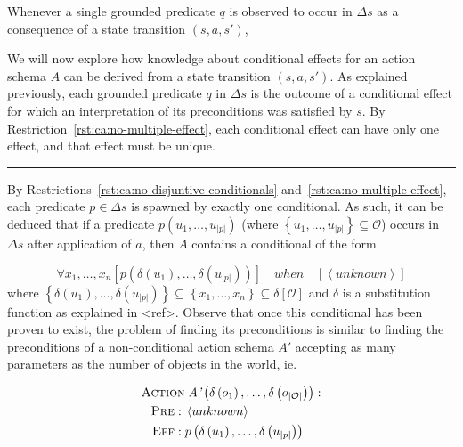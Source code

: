 \documentclass[../Master.tex]{subfiles}
\begin{document}
Whenever a single grounded predicate $q$ is observed to occur in $\Delta s$ as a consequence of a state transition $\left(s, a, s'\right)$, 

We will now explore how knowledge about conditional effects for an action schema $A$ can be derived from a  state transition $\left( s, a ,s' \right)$. As explained previously, each grounded predicate $q$ in $\Delta s$ is the outcome of a conditional effect for which an interpretation of its preconditions was satisfied by $s$. By Restriction~\ref{rst:ca:no-multiple-effect}, each conditional effect can have only one effect, and that effect must be unique. 

\noindent\rule{\textwidth}{1pt}

By Restrictions~\ref{rst:ca:no-disjuntive-conditionals} and~\ref{rst:ca:no-multiple-effect}, each predicate $p \in \Delta s$ is spawned by exactly one conditional. As such, it can be deduced that if a predicate $p\left(u_1, \dots, u_{|p|}\right)$ (where $\left\{u_1, \dots, u_{|p|}\right\} \subseteq \mathcal{O}$) occurs in $\Delta s$ after application of $a$, then $A$ contains a conditional of the form

\begin{equation*}
    \forall x_1, \dots, x_n 
        \left[ p\left(\delta\left(u_1\right), \dots, \delta \left(u_{|p|}\right) \right) \right] \quad when \quad 
        \left[ \left<unknown\right> \right]
\end{equation*}
where $\left\{\delta \left( u_1 \right), \dots, \delta \left(u_{|p|} \right) \right\} \subseteq \left\{ x_1, \dots, x_n \right\} \subseteq \delta [\mathcal{O}]$ and $\delta$ is a substitution function as explained in <ref>. Observe that once this conditional has been proven to exist, the problem of finding its preconditions is similar to finding the preconditions of a non-conditional action schema $A'$ accepting as many parameters as the number of objects in the world, ie. 

\begin{align*}
    \begin{split}
        \textsc{Action} &\; \textit{A'}\left(\delta \left( o_1 \right), \ldots, \delta \left( o_{|\mathcal{O}|}\right)\right): \\
        \textsc{Pre}: \; & \left< unknown \right> \\
        \textsc{Eff}: \; & p\left( \delta \left(u_1\right), \dots, \delta \left( u_{|p|} \right)\right)
    \end{split}
\end{align*}
\end{document}
